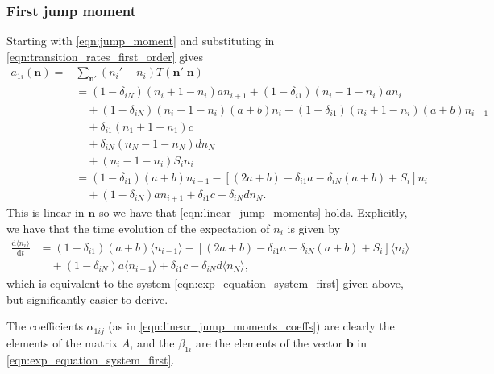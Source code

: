 \documentclass[a4paper,11pt]{article}
\numberwithin{equation}{section}
\newcommand{\diff}[2]{\frac{\mathrm{d} #1}{\mathrm{d} #2}}
\newcommand{\V}[1]{\mathbf{#1}}
\newcommand{\E}[1]{\langle #1 \rangle}
\begin{document}
\subsubsection{First jump moment}
Starting with \eqref{eqn:jump_moment} and substituting in
\eqref{eqn:transition_rates_first_order} gives
\begin{equation}
    \begin{aligned}
        a_{1i}(\V{n}) =& \sum_{\V{n}'} (n_i' - n_i) T(\V{n}' | \V{n})\\
        &= (1-\delta_{iN})(n_i + 1 - n_i)a n_{i+1}
        +  (1-\delta_{i1})(n_i - 1 - n_i)a n_i\\
        &\quad+ (1-\delta_{iN})(n_i - 1 - n_i)(a+b) n_i
        +  (1-\delta_{i1})(n_i + 1 - n_i)(a+b) n_{i-1}\\
        &\quad+ \delta_{i1}(n_1 + 1 - n_1) c\\
        &\quad+ \delta_{iN}(n_N - 1 - n_N) d n_N\\
        &\quad+ (n_i - 1 - n_i) S_i n_i\\
        &= (1-\delta_{i1})(a+b)n_{i-1} - \left[(2a+b) - \delta_{i1}a -
        \delta_{iN}(a+b) + S_i\right]n_i\\
        &\quad+ (1-\delta_{iN})an_{i+1} + \delta_{i1}c - \delta_{iN}d n_N.
    \end{aligned}
    \label{eqn:first_jump_mom_first_order}
\end{equation}
This is linear in \(\V{n}\) so we have that \eqref{eqn:linear_jump_moments}
holds. Explicitly, we have that the time evolution of the expectation of \(n_i\)
is given by
\begin{equation}
    \begin{aligned}
        \diff{\E{n_i}}{t} &= (1-\delta_{i1})(a+b)\E{n_{i-1}} - \left[(2a+b) -
        \delta_{i1}a - \delta_{iN}(a+b) + S_i\right]\E{n_i}\\
        &\quad+(1-\delta_{iN})a\E{n_{i+1}} + \delta_{i1}c - \delta_{iN}d \E{n_N},
    \end{aligned}
\end{equation}
which is equivalent to the system \eqref{eqn:exp_equation_system_first} given
above, but significantly easier to derive.

The coefficients \(\alpha_{1ij}\) (as in \eqref{eqn:linear_jump_moments_coeffs})
are clearly the elements of the matrix \(A\), and the \(\beta_{1i}\) are the
elements of the vector \(\V{b}\) in \eqref{eqn:exp_equation_system_first}.
\end{document}
